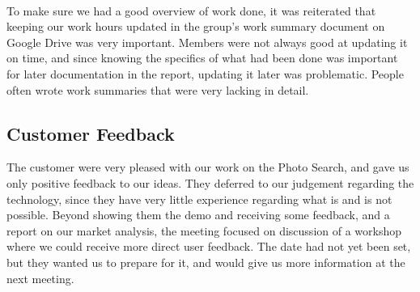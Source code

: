 \paragraph{} To make sure we had a good overview of work done, it was reiterated that keeping our work hours updated in the group's work summary document on Google Drive was very important. Members were not always good at updating it on time, and since knowing the specifics of what had been done was important for later documentation in the report, updating it later was problematic. People often wrote work summaries that were very lacking in detail.

\subsection{Customer Feedback}
\label{subsec:S1RetrospectiveCustomerFeedback}
The customer were very pleased with our work on the Photo Search, and gave us only positive feedback to our ideas. They deferred to our judgement regarding the technology, since they have very little experience regarding what is and is not possible. Beyond showing them the demo and receiving some feedback, and a report on our market analysis, the meeting focused on discussion of a workshop where we could receive more direct user feedback. The date had not yet been set, but they wanted us to prepare for it, and would give us more information at the next meeting.